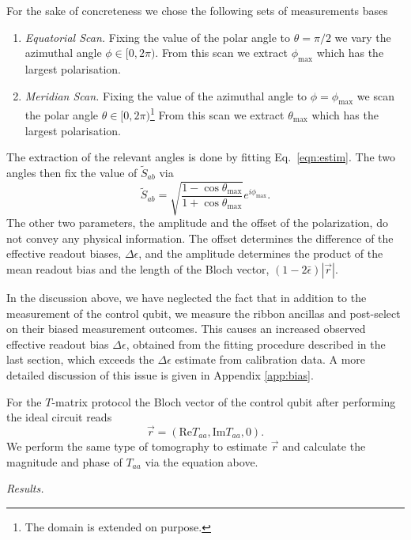 \documentclass[two column]{article}
\begin{document}
For the sake of concreteness we chose the following sets of measurements bases  \begin{enumerate}
    \item \emph{Equatorial Scan.} Fixing the value of the polar angle to $\theta = \pi/2$ we vary the azimuthal angle $\phi \in [0, 2\pi)$. From this scan we extract $\phi_{\text{max}}$ which has the largest polarisation.
    \item \emph{Meridian Scan.} Fixing the value of the azimuthal angle to $\phi = \phi_{\text{max}}$ we scan the polar angle $\theta \in [0, 2\pi)$\footnote{The domain is extended on purpose.} From this scan we extract $\theta_{\text{max}}$ which has the largest polarisation.
\end{enumerate}
The extraction of the relevant angles is done by fitting Eq.~\eqref{eqn:estim}.
The two angles then fix the value of $\tilde{S}_{ab}$ via $$\tilde{S}_{ab} = \sqrt{\frac{1-\cos{\theta_{\text{max}}}}{1+\cos{\theta_{\text{max}}}}}e^{i\phi_{\text{max}}}.$$
The other two parameters, the amplitude and the offset of the polarization, do not convey any physical information. The offset determines the difference of the effective readout biases, $\Delta\epsilon$, and the amplitude determines the product of the mean readout bias and the length of the Bloch vector, $(1-2\bar{\epsilon})|\vec{r}|$.


In the discussion above, we have neglected the fact that in addition to the measurement of the control qubit, we measure the ribbon ancillas and post-select on their biased measurement outcomes. This causes an increased observed effective readout bias $\Delta \epsilon$, obtained from the fitting procedure described in the last section, which exceeds the $\Delta \epsilon$ estimate from calibration data. A more detailed discussion of this issue is given in Appendix \ref{app:bias}. 


For the $T$-matrix protocol the Bloch vector of the control qubit after performing the ideal circuit reads
\begin{equation}
    \vec{r} = \left(  \text{Re}{T}_{aa}, \text{Im}{T}_{aa}, 0 \right).\label{eqn:blochT} 
\end{equation}
We perform the same type of tomography to estimate $\vec r$ and calculate the magnitude and phase of $T_{aa}$ via the equation above.




\emph{Results.}
\end{document}
